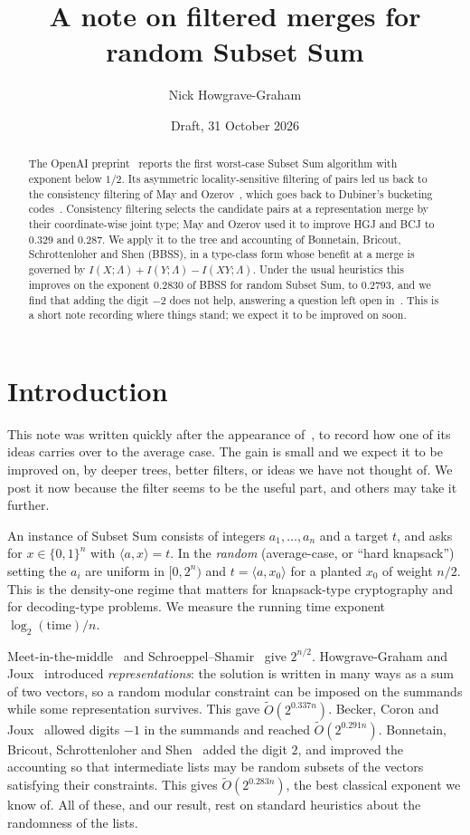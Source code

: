 \documentclass[11pt]{article}
\title{A note on filtered merges for random Subset Sum}
\author{Nick Howgrave-Graham}
\date{Draft, 31 October 2026}
\theoremstyle{definition}
\theoremstyle{remark}
\newcommand{\Ot}{\widetilde{O}}
\begin{document}
\maketitle

\begin{abstract}
The OpenAI preprint~\cite{OAI26} reports the first worst-case Subset Sum algorithm with exponent below $1/2$. Its
asymmetric locality-sensitive filtering of pairs led us back to the consistency filtering of May and
Ozerov~\cite{Oze16}, which goes back to Dubiner's bucketing codes~\cite{Dub10}. Consistency filtering selects the
candidate pairs at a representation merge by their coordinate-wise joint type; May and Ozerov used it to improve HGJ
and BCJ to $0.329$ and $0.287$. We apply it to the tree and accounting of Bonnetain, Bricout,
Schrottenloher and Shen (BBSS), in a type-class form whose benefit at a merge is governed by
$I(X;\Lambda)+I(Y;\Lambda)-I(XY;\Lambda)$. Under the usual heuristics this improves on the exponent $0.2830$ of BBSS
for random Subset Sum, to $0.2793$, and we find that adding the digit $-2$ does not help, answering a question left
open in~\cite{Oze16}. This is a short note recording where things stand; we expect it to be improved on
soon.
\end{abstract}

\section{Introduction}
This note was written quickly after the appearance of~\cite{OAI26}, to record how one of its ideas carries over to
the average case. The gain is small and we expect it to be improved on, by deeper trees, better filters, or ideas we
have not thought of. We post it now because the filter seems to be the useful part, and others may take it further.

An instance of Subset Sum consists of integers $a_1,\dots,a_n$ and a target $t$, and asks for
$x\in\{0,1\}^n$ with $\langle a,x\rangle=t$. In the \emph{random} (average-case, or ``hard knapsack'') setting the
$a_i$ are uniform in $[0,2^n)$ and $t=\langle a,x_0\rangle$ for a planted $x_0$ of weight $n/2$. This is the
density-one regime that matters for knapsack-type cryptography and for decoding-type problems. We measure the
running time exponent $\log_2(\text{time})/n$.

Meet-in-the-middle~\cite{HS74} and Schroeppel--Shamir~\cite{SS81} give $2^{n/2}$. Howgrave-Graham and
Joux~\cite{HGJ10} introduced \emph{representations}: the solution is written in many ways as a sum of two vectors,
so a random modular constraint can be imposed on the summands while some representation survives. This gave
$\Ot(2^{0.337n})$. Becker, Coron and Joux~\cite{BCJ11} allowed digits $-1$ in the summands and reached
$\Ot(2^{0.291n})$. Bonnetain, Bricout, Schrottenloher and Shen~\cite{BBSS20} added the digit $2$, and improved the
accounting so that intermediate lists may be random subsets of the vectors satisfying their constraints. This gives
$\Ot(2^{0.283n})$, the best classical exponent we know of. All of these, and our result, rest on standard
heuristics about the randomness of the lists.
\end{document}

